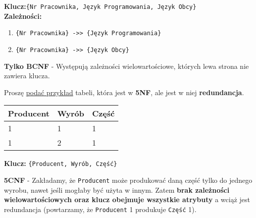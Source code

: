 \vskip 0.5cm

\textbf{Klucz:}\texttt{\{Nr Pracownika, Język Programowania, Język Obcy\}}\\
\textbf{Zależności:}
\begin{enumerate}
    \item \texttt{\{Nr Pracownika\} ->> \{Język Programowania\}}
    \item \texttt{\{Nr Pracownika\} ->> \{Język Obcy\}}
\end{enumerate}

\begin{tcolorbox}
    \textbf{Tylko BCNF} - Występują zależności wielowartościowe, których lewa
    strona nie zawiera klucza.
\end{tcolorbox}


\horrule{0.5pt}
Proszę \underline{podać przykład} tabeli, która jest w \textbf{5NF},
ale jest w niej \textbf{redundancja}.\\
\horrule{0.5pt}

\vskip 0.5cm

\begin{center}
    \begin{tabular}{|l|l|l|}
        \hline
        \textbf{Producent} &
        \textbf{Wyrób} &
        \textbf{Część}\\
        \hline
        1 & 1 & 1 \\
        \hline
        1 & 2 & 1 \\
        \hline
    \end{tabular}
\end{center}

\vskip 0.5cm

\textbf{Klucz:} \texttt{\{Producent, Wyrób, Część\}}\\

\begin{tcolorbox}
    \textbf{5CNF} - Zakładamy, że \texttt{Producent} może produkować daną część
    tylko do jednego wyrobu, nawet jeśli mogłaby być użyta w innym. Zatem
    \textbf{brak zależności wielowartościowych oraz klucz obejmuje wszystkie
    atrybuty} a wciąż jest redundancja (powtarzamy, że \texttt{Producent} 1
    produkuje \texttt{Część} 1).
\end{tcolorbox}

\pagebreak

